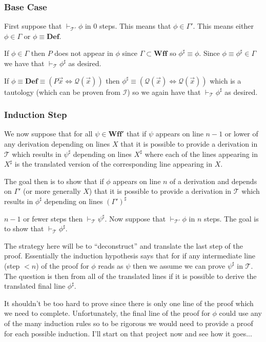 \documentclass[12pt]{article}
\newcommand{\bv}[1]{\boldsymbol{#1}}
\newcommand{\mc}[1]{\mathcal{#1}}
\newcommand{\bc}[1]{\bv{\mc{#1}}}
\begin{document}
\subsubsection*{Base Case}
First suppose that $\vdash_{\bc{T}'}\phi$ in 0 steps. This means that $\phi \in \Gamma'$. This means either $\phi \in \Gamma$ or $\phi \equiv \textbf{Def}$. 

If $\phi \in \Gamma$ then $P$ does not appear in $\phi$ since $\Gamma \subset \textbf{Wff}$ so $\phi^{\sharp} \equiv \phi$. Since $\phi \equiv \phi^{\sharp} \in \Gamma$ we have that $\vdash_{\bc{T}}\phi^{\sharp}$ as desired.

If $\phi \equiv \textbf{Def} \equiv (P\vec{x} \Leftrightarrow \mc{Q}(\vec{x}))$ then $\phi^{\sharp} \equiv (\mc{Q}(\vec{x}) \Leftrightarrow \mc{Q}(\vec{x}))$ which is a tautology (which can be proven from $\bc{I}$) so we again have that $\vdash_{\bc{T}}\phi^{\sharp}$ as desired.

\subsubsection*{Induction Step}
We now suppose that for all $\psi\in \textbf{Wff}'$ that if $\psi$ appears on line $n-1$ or lower of any derivation depending on lines $X$ that it is possible to provide a derivation in $\bc{T}$ which results in $\psi^{\sharp}$ depending on lines $X^{\sharp}$ where each of the lines appearing in $X^{\sharp}$ is the translated version of the corresponding line appearing in $X$.

The goal then is to show that if $\phi$ appears on line $n$ of a derivation and depends on $\Gamma'$ (or more generally $X$) that it is possible to provide a derivation in $\bc{T}$ which results in $\phi^{\sharp}$  depending on lines $(\Gamma')^{\sharp}$

$n-1$ or fewer steps then $\vdash_{\bc{T}}\psi^{\sharp}$. Now suppose that $\vdash_{\bc{T}'}\phi$ in $n$ steps. The goal is to show that $\vdash_{\bc{T}}\phi^{\sharp}$.

The strategy here will be to ``deconstruct'' and translate the last step of the proof. Essentially the induction hypothesis says that for if any intermediate line (step $<n$) of the proof for $\phi$ reads as $\psi$ then we assume we can prove $\psi^{\sharp}$ in $\bc{T}$. The question is then from all of the translated lines if it is possible to derive the translated final line $\phi^{\sharp}$.

It shouldn't be too hard to prove since there is only one line of the proof which we need to complete. Unfortunately, the final line of the proof for $\phi$ could use any of the many induction rules so to be rigorous we would need to provide a proof for each possible induction. I'll start on that project now and see how it goes...
\end{document}

